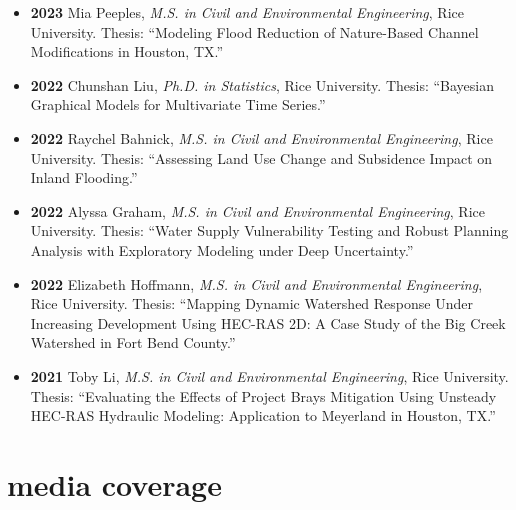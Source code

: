\documentclass[10pt,oneside]{article}
\begin{document}
\begin{itemize}[label={}]
  \item \textbf{2023} \quad Mia Peeples, \textit{M.S. in Civil and Environmental Engineering}, Rice University. Thesis: \enquote{Modeling Flood Reduction of Nature-Based Channel Modifications in Houston, TX.}

  \item \textbf{2022} \quad Chunshan Liu, \textit{Ph.D. in Statistics}, Rice University. Thesis: \enquote{Bayesian Graphical Models for Multivariate Time Series.}

  \item \textbf{2022} \quad Raychel Bahnick, \textit{M.S. in Civil and Environmental Engineering}, Rice University. Thesis: \enquote{Assessing Land Use Change and Subsidence Impact on Inland Flooding.}

  \item \textbf{2022} \quad Alyssa Graham, \textit{M.S. in Civil and Environmental Engineering}, Rice University. Thesis: \enquote{Water Supply Vulnerability Testing and Robust Planning Analysis with Exploratory Modeling under Deep Uncertainty.}

  \item \textbf{2022} \quad Elizabeth Hoffmann, \textit{M.S. in Civil and Environmental Engineering}, Rice University. Thesis: \enquote{Mapping Dynamic Watershed Response Under Increasing Development Using HEC-RAS 2D: A Case Study of the Big Creek Watershed in Fort Bend County.}

  \item \textbf{2021} \quad Toby Li, \textit{M.S. in Civil and Environmental Engineering}, Rice University. Thesis: \enquote{Evaluating the Effects of Project Brays Mitigation Using Unsteady HEC-RAS Hydraulic Modeling: Application to Meyerland in Houston, TX.}

\end{itemize}


\section{media coverage}

\mbox{}\vspace{-\dimexpr\baselineskip\relax}
\end{document}
